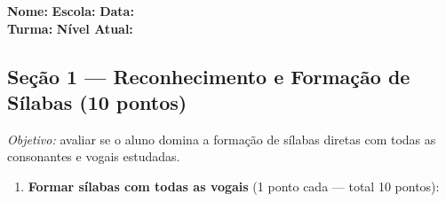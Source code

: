 \begin{avaliacao}
\begin{center}
\end{center}

\vspace{0.5em}
\noindent\textbf{Nome:} \underline{\hspace{5cm}} \quad
\textbf{Escola:} \underline{\hspace{4cm}} \quad
\textbf{Data:} \underline{\hspace{2.5cm}}\\[0.5em]
\noindent\textbf{Turma:} \underline{\hspace{2cm}} \quad
\textbf{N\'{i}vel Atual:} \underline{\hspace{3cm}}

\subsection*{Seção 1 — Reconhecimento e Formação de Sílabas (10 pontos)}

\textit{Objetivo:} avaliar se o aluno domina a forma\c{c}\~{a}o de
s\'{i}labas diretas com todas as consonantes e vogais estudadas.

\begin{enumerate}
  \item \textbf{Formar s\'{i}labas com todas as vogais} (1 ponto cada — total 10 pontos):

  \begin{center}
  \end{center}
\end{enumerate}


\end{avaliacao}
